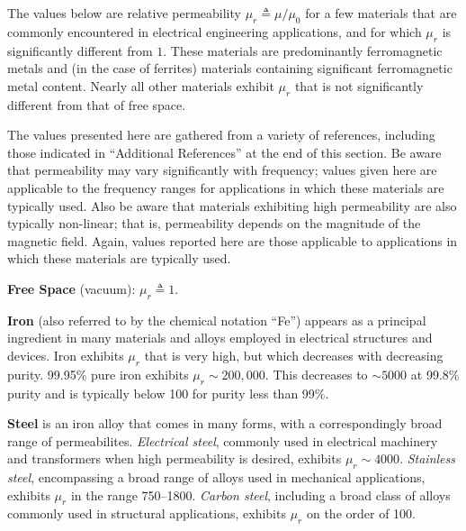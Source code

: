 

\label{m0136_Table_of_Permeabilities} %

The values below are relative permeability 
$\mu_r \triangleq \mu/\mu_0$ for a few materials that are commonly encountered in electrical engineering applications, and for which $\mu_r$ is significantly different from $1$. These materials are predominantly ferromagnetic metals and (in the case of ferrites) materials containing significant ferromagnetic metal content.
Nearly all other materials exhibit $\mu_r$ that is not significantly different from that of free space.

The values presented here are gathered from a variety of references, including those indicated in ``Additional References'' at the end of this section.
Be aware that permeability may vary significantly with frequency; values given here are applicable to the frequency ranges for applications in which these materials are typically used.
Also be aware that materials exhibiting high permeability are also typically non-linear; that is, permeability depends on the magnitude of the magnetic field.
Again, values reported here are those applicable to applications in which these materials are typically used.  

{\bf Free Space} (vacuum): $\mu_r\triangleq 1$.

{\bf Iron} 
(also referred to by the chemical notation ``Fe'') appears as a principal ingredient in many materials and alloys employed in electrical structures and devices.
Iron exhibits $\mu_r$ that is very high, but which decreases with decreasing purity.  
99.95\% pure iron exhibits $\mu_r\sim 200,000$.
This decreases to $\sim 5000$ at 99.8\% purity and is typically below 100 for purity less than 99\%. 

{\bf Steel} 
is an iron alloy that comes in many forms, with a correspondingly broad range of permeabilites. 
\emph{Electrical steel}, commonly used in electrical machinery and transformers when high permeability is desired, exhibits $\mu_r\sim 4000$. %
\emph{Stainless steel}, encompassing a broad range of alloys used in mechanical applications, exhibits $\mu_r$ in the range 750--1800. %
\emph{Carbon steel}, including a broad class of alloys commonly used in structural applications,  exhibits $\mu_r$ on the order of 100. %

